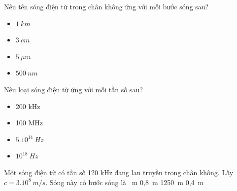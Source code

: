 \begin{vidu}
Nêu tên sóng điện từ trong chân không ứng với mỗi bước sóng sau?
\begin{itemize}
\item[a.] {$1\ km$}
\item[b.] {$3\ cm$}
\item[c.] {$5\ \mu m$}
\item[d.] {$500\ nm$} 
\end{itemize}
\end{vidu} 
\begin{vidu}
Nêu loại sóng điện từ ứng với mỗi tần số sau?
\begin{itemize}
\item[a.] {200 kHz}
\item[b.] {100 MHz}
\item[c.] {$5.10^{14}\ Hz$} 
\item[d.] {$10^{18}\ Hz$}  
\end{itemize}
\end{vidu} 
\begin{vidu} %
 Một sóng điện từ có tần số 120 kHz đang lan truyền trong chân không. Lấy $c = 3.10^8\ m/s$. Sóng này có bước sóng là
\choice
{\ m}
{0,8\ m}
{1250\ m}
{0,4\ m}
\end{vidu} 
